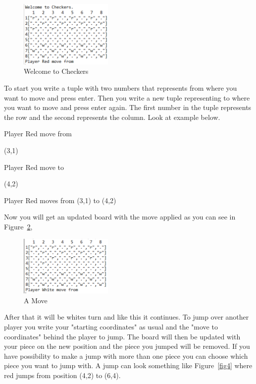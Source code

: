 \documentclass[12pt,a4paper]{article}
\begin{document}
\begin{figure}[htp]
\centering
\includegraphics[width= 0.4\textwidth]{start.PNG}
\caption{Welcome to Checkers}
\label{fig2}
\end{figure}

To start you write a tuple with two numbers that represents from where you want to move and press enter. Then you write a new tuple representing to where you want to move and press enter again. The first number in the tuple represents the row and the second represents the column. Look at example below.


Player Red move from

(3,1)

Player Red move to

(4,2)

Player Red moves from  (3,1)  to  (4,2)

Now you will get an updated board with the move applied as you can see in Figure~\ref{fig3},
\begin{figure}[htp]
\centering
\includegraphics[width= 0.4\textwidth]{firstmove.PNG}
\caption{A Move}
\label{fig3}
\end{figure}

After that it will be whites turn and like this it continues. 
\newpage
To jump over another player you write your "starting coordinates" as usual and the "move to coordinates" behind the player to jump. The board will then be updated with your piece on the new position and the piece you jumped will be removed. If you have possibility to make a jump with more than one piece you can choose which piece you want to jump with. A jump can look something like Figure~\ref{fig4} where red jumps from position (4,2) to (6,4).
\end{document}
